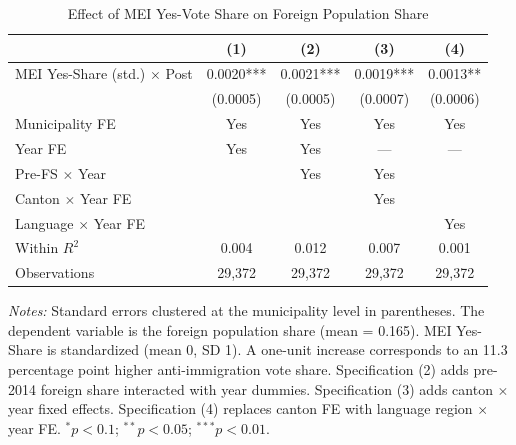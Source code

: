 \begin{table}[htbp]
\centering
\caption{Effect of MEI Yes-Vote Share on Foreign Population Share}
\label{tab:main_did}
\begin{tabular}{lcccc}
\hline\hline
 & (1) & (2) & (3) & (4) \\
\hline
MEI Yes-Share (std.) $\times$ Post & 0.0020*** & 0.0021*** & 0.0019*** & 0.0013** \\
 & (0.0005) & (0.0005) & (0.0007) & (0.0006) \\
\hline
Municipality FE & Yes & Yes & Yes & Yes \\
Year FE & Yes & Yes & --- & --- \\
Pre-FS $\times$ Year & & Yes & Yes & \\
Canton $\times$ Year FE & & & Yes & \\
Language $\times$ Year FE & & & & Yes \\
Within $R^2$ & 0.004 & 0.012 & 0.007 & 0.001 \\
Observations & 29,372 & 29,372 & 29,372 & 29,372 \\
\hline\hline
\end{tabular}
\begin{tablenotes}[flushleft]\footnotesize
\item \textit{Notes:} Standard errors clustered at the municipality level in parentheses. The dependent variable is the foreign population share (mean = 0.165). MEI Yes-Share is standardized (mean 0, SD 1). A one-unit increase corresponds to an 11.3 percentage point higher anti-immigration vote share. Specification (2) adds pre-2014 foreign share interacted with year dummies. Specification (3) adds canton $\times$ year fixed effects. Specification (4) replaces canton FE with language region $\times$ year FE. $^{*}p<0.1$; $^{**}p<0.05$; $^{***}p<0.01$.
\end{tablenotes}
\end{table}

